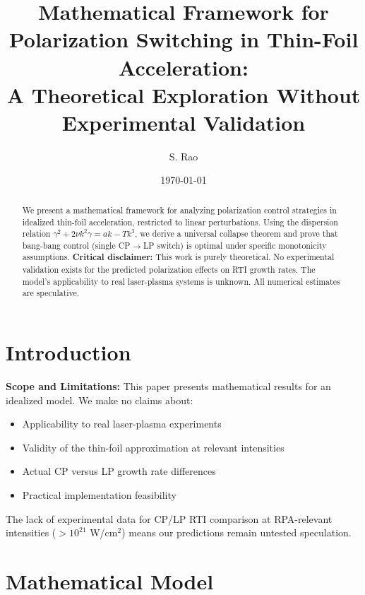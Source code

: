 \documentclass[aps,pre,twocolumn,showpacs,superscriptaddress]{revtex4-2}
\begin{document}
\title{Mathematical Framework for Polarization Switching in Thin-Foil Acceleration:\\
A Theoretical Exploration Without Experimental Validation}

\author{S. Rao}

\date{\today}

\begin{abstract}
We present a mathematical framework for analyzing polarization control strategies in idealized thin-foil acceleration, restricted to linear perturbations. Using the dispersion relation $\gamma^2+2\nu k^2\gamma=ak-Tk^3$, we derive a universal collapse theorem and prove that bang-bang control (single CP$\to$LP switch) is optimal under specific monotonicity assumptions. 
\textbf{Critical disclaimer:} This work is purely theoretical. No experimental validation exists for the predicted polarization effects on RTI growth rates. The model's applicability to real laser-plasma systems is unknown. All numerical estimates are speculative.
\end{abstract}

\maketitle

\section{Introduction}

\textbf{Scope and Limitations:} This paper presents mathematical results for an idealized model. We make no claims about:
\begin{itemize}
\item Applicability to real laser-plasma experiments
\item Validity of the thin-foil approximation at relevant intensities
\item Actual CP versus LP growth rate differences
\item Practical implementation feasibility
\end{itemize}

The lack of experimental data for CP/LP RTI comparison at RPA-relevant intensities ($>10^{21}$ W/cm$^2$) means our predictions remain untested speculation.

\section{Mathematical Model}
\end{document}
